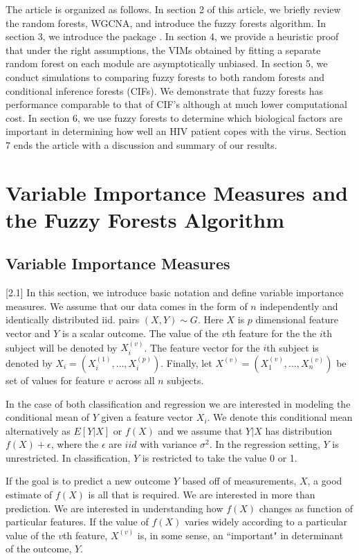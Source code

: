 \documentclass[article,shortnames]{jss}
\begin{document}
The article is organized as follows.  In section 2 of this article, we briefly review the random forests, WGCNA, and introduce the fuzzy forests algorithm.
In section 3, we introduce the  package .  In section 4, we provide a heuristic proof that under the right assumptions, the VIMs obtained by fitting a separate random forest on each module are asymptotically unbiased.  In section 5, we conduct simulations to comparing fuzzy forests to both random forests and conditional inference forests (CIFs).  We demonstrate that fuzzy forests has performance comparable to that of CIF's although at much lower computational cost.  In section 6, we use fuzzy forests to determine which biological factors are important in determining how well an HIV patient copes with the virus.  Section 7 ends the article with a discussion and summary of our results. 

\section[Fuzzy Forests Algorithm]{Variable Importance Measures and the Fuzzy Forests Algorithm}
\subsection{Variable Importance Measures}[2.1]
In this section, we introduce basic notation and define variable importance measures.  We assume that our data comes in the form of $n$ independently and identically distributed iid.
pairs $(X,Y) \sim G$.  Here $X$ is $p$ dimensional feature vector and $Y$ is a scalar outcome.  The value of the $v$th feature for the the $i$th subject will be denoted by $X_{i}^{(v)}$.
The feature vector for the $i$th subject is denoted by $X_{i}=(X_{i}^{(1)},\ldots,X_{i}^{(p)})$.   Finally, let $X^{(v)}=(X_{1}^{(v)},\ldots,X_{n}^{(v)})$ be set of values for feature $v$ across
all $n$ subjects.

In the case of both classification and regression we are interested in modeling the conditional mean of $Y$ given a feature vector $X_{i}$.  We denote this conditional mean alternatively as $E[Y|X]$ or $f(X)$ and we assume that $Y|X$ has distribution $f(X) + \epsilon$, where the $\epsilon$ are $iid$ with variance $\sigma^{2}$.   In the regression setting, $Y$ is unrestricted. 
In classification, $Y$ is restricted to take the value 0 or 1.  

If the goal is to predict a new outcome $Y$ based off of measurements, $X$, a good estimate of $f(X)$ is all that is required.
We are interested in more than prediction.  We are interested in understanding how $f(X)$ changes as function of particular features. 
If the value of $f(X)$ varies widely according to a particular value of the $v$th feature, $X^{(v)}$ is, in some sense, an ``important" in determinant of
the outcome, $Y$.  
\end{document}
